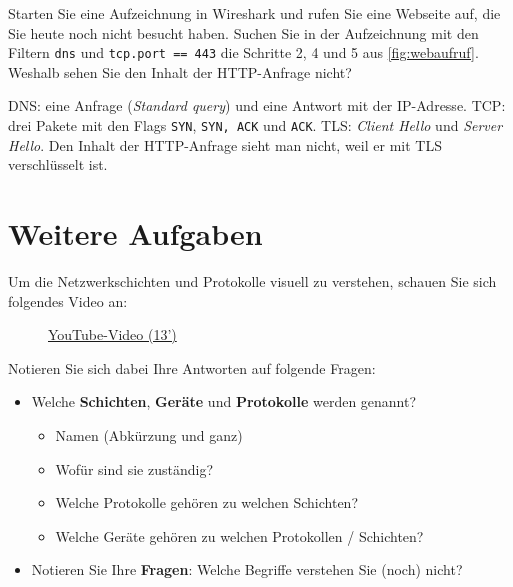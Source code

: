 \begin{mychallenge}
    Starten Sie eine Aufzeichnung in Wireshark und rufen Sie eine Webseite auf, die Sie heute noch nicht besucht haben. Suchen Sie in der Aufzeichnung mit den Filtern \texttt{dns} und \texttt{tcp.port == 443} die Schritte 2, 4 und 5 aus \cref{fig:webaufruf}. Weshalb sehen Sie den Inhalt der \gls{HTTP}-Anfrage nicht?

    \begin{myanswer}
        \gls{DNS}: eine Anfrage (\textit{Standard query}) und eine Antwort mit der \gls{IP}-Adresse. \gls{TCP}: drei Pakete mit den Flags \texttt{SYN}, \texttt{SYN, ACK} und \texttt{ACK}. \gls{TLS}: \textit{Client Hello} und \textit{Server Hello}. Den Inhalt der \gls{HTTP}-Anfrage sieht man nicht, weil er mit \gls{TLS} verschlüsselt ist.
    \end{myanswer}
\end{mychallenge}

\section{Weitere Aufgaben}

\begin{myexercise}
	Um die Netzwerkschichten und Protokolle visuell zu verstehen, schauen Sie sich folgendes Video an:
	\begin{figure}[H]
		\href{https://www.youtube.com/watch?v=PBWhzz_Gn10}{YouTube-Video (13')}
	\end{figure}

	Notieren Sie sich dabei Ihre Antworten auf folgende Fragen:
	\begin{itemize}
		\item Welche \textbf{Schichten}, \textbf{Geräte} und \textbf{Protokolle} werden genannt?
		      \begin{itemize}
			      \item Namen (Abkürzung und ganz)
			      \item Wofür sind sie zuständig?
			      \item Welche Protokolle gehören zu welchen Schichten?
			      \item Welche Geräte gehören zu welchen Protokollen / Schichten?
		      \end{itemize}
		\item Notieren Sie Ihre \textbf{Fragen}: Welche Begriffe verstehen Sie (noch) nicht?
	\end{itemize}
\end{myexercise}

